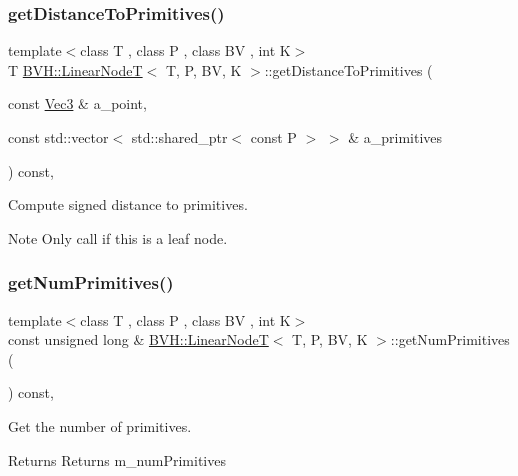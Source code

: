 \subsubsection{\texorpdfstring{get\+Distance\+To\+Primitives()}{getDistanceToPrimitives()}}
{\footnotesize\ttfamily template$<$class T , class P , class BV , int K$>$ \\
T \hyperlink{classBVH_1_1LinearNodeT}{B\+V\+H\+::\+Linear\+NodeT}$<$ T, P, BV, K $>$\+::get\+Distance\+To\+Primitives (\begin{DoxyParamCaption}\item[{const \hyperlink{classBVH_1_1LinearNodeT_a073e87d51d44b4cc243c8f90690247a6}{Vec3} \&}]{a\+\_\+point,  }\item[{const std\+::vector$<$ std\+::shared\+\_\+ptr$<$ const P $>$ $>$ \&}]{a\+\_\+primitives }\end{DoxyParamCaption}) const\hspace{0.3cm}{\ttfamily [inline]}, {\ttfamily [noexcept]}}



Compute signed distance to primitives. 

\begin{DoxyNote}{Note}
Only call if this is a leaf node. 
\end{DoxyNote}
\mbox{\label{classBVH_1_1LinearNodeT_a245e67b6824cadf1733c3c9176259106}} 
\subsubsection{\texorpdfstring{get\+Num\+Primitives()}{getNumPrimitives()}}
{\footnotesize\ttfamily template$<$class T , class P , class BV , int K$>$ \\
const unsigned long \& \hyperlink{classBVH_1_1LinearNodeT}{B\+V\+H\+::\+Linear\+NodeT}$<$ T, P, BV, K $>$\+::get\+Num\+Primitives (\begin{DoxyParamCaption}{ }\end{DoxyParamCaption}) const\hspace{0.3cm}{\ttfamily [inline]}, {\ttfamily [noexcept]}}



Get the number of primitives. 

\begin{DoxyReturn}{Returns}
Returns m\+\_\+num\+Primitives 
\end{DoxyReturn}
\mbox{\label{classBVH_1_1LinearNodeT_a8cfca65bd808adc8eb2793e7d7aabcd3}} 
